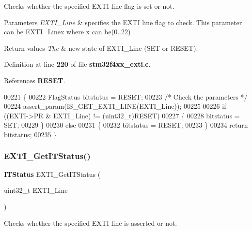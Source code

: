 Checks whether the specified E\+X\+TI line flag is set or not. 


\begin{DoxyParams}{Parameters}
{\em E\+X\+T\+I\+\_\+\+Line} & specifies the E\+X\+TI line flag to check. This parameter can be E\+X\+T\+I\+\_\+\+Linex where x can be(0..22) \\
\hline
\end{DoxyParams}

\begin{DoxyRetVals}{Return values}
{\em The} & new state of E\+X\+T\+I\+\_\+\+Line (S\+ET or R\+E\+S\+ET). \\
\hline
\end{DoxyRetVals}


Definition at line \textbf{ 220} of file \textbf{ stm32f4xx\+\_\+exti.\+c}.



References \textbf{ R\+E\+S\+ET}.


\begin{DoxyCode}
00221 \{
00222   FlagStatus bitstatus = RESET;
00223   \textcolor{comment}{/* Check the parameters */}
00224   assert_param(IS_GET_EXTI_LINE(EXTI\_Line));
00225   
00226   \textcolor{keywordflow}{if} ((EXTI->PR & EXTI\_Line) != (uint32\_t)RESET)
00227   \{
00228     bitstatus = SET;
00229   \}
00230   \textcolor{keywordflow}{else}
00231   \{
00232     bitstatus = RESET;
00233   \}
00234   \textcolor{keywordflow}{return} bitstatus;
00235 \}
\end{DoxyCode}
\mbox{\label{group__EXTI__Group2_gaf7b51519062ae42fd27ee689cab364aa}} 
\subsubsection{E\+X\+T\+I\+\_\+\+Get\+I\+T\+Status()}
{\footnotesize\ttfamily \textbf{ I\+T\+Status} E\+X\+T\+I\+\_\+\+Get\+I\+T\+Status (\begin{DoxyParamCaption}\item[{uint32\+\_\+t}]{E\+X\+T\+I\+\_\+\+Line }\end{DoxyParamCaption})}



Checks whether the specified E\+X\+TI line is asserted or not. 


